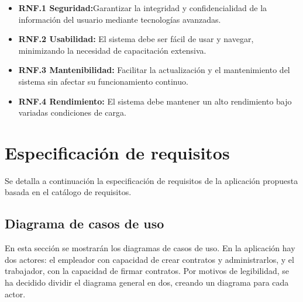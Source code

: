 \begin{itemize}

\item \textbf{RNF.1 Seguridad:}Garantizar la integridad y confidencialidad de la información del usuario mediante tecnologías avanzadas.

\item \textbf{RNF.2 Usabilidad:} El sistema debe ser fácil de usar y navegar, minimizando la necesidad de capacitación extensiva.

\item \textbf{RNF.3 Mantenibilidad:} Facilitar la actualización y el mantenimiento del sistema sin afectar su funcionamiento continuo.

\item \textbf{RNF.4 Rendimiento:} El sistema debe mantener un alto rendimiento bajo variadas condiciones de carga.

\end{itemize}


\section{Especificación de requisitos}

Se detalla a continuación la especificación de requisitos de la aplicación propuesta basada en el catálogo de requisitos.

\subsection{Diagrama de casos de uso}

En esta sección se mostrarán los diagramas de casos de uso. En la aplicación hay dos actores: el empleador con capacidad de crear contratos y administrarlos, y el trabajador, con la capacidad de firmar contratos.
Por motivos de legibilidad, se ha decidido dividir el diagrama general en dos, creando un diagrama para cada actor. 



